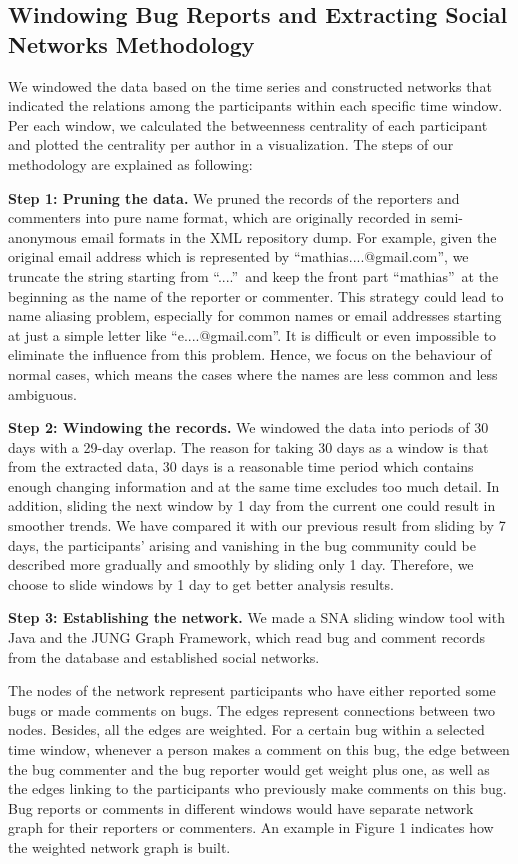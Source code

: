 \documentclass[10pt, conference, compsocconf]{IEEEtran}
\begin{document}
\subsection{Windowing Bug Reports and Extracting Social Networks Methodology}
We windowed the data based on the time series and constructed networks
that indicated the relations among the participants within each specific
time window. Per each window, we calculated the betweenness centrality of each
participant and plotted the centrality per author in a visualization. The steps of our methodology are
explained as following:


\textbf{Step 1: Pruning the data.} We pruned the records of the
reporters and commenters into pure name format, which are originally
recorded in semi-anonymous email formats in the XML repository dump. 
For example, given the original email address which is represented by
\textquotedblleft mathias....@gmail.com\textquotedblright, we truncate
the string starting from \textquotedblleft ....\textquotedblright \
and keep the front part \textquotedblleft mathias\textquotedblright \
at the beginning as the name of the reporter or commenter. 
This strategy could lead to name aliasing problem, especially for
common names or email addresses starting at just a simple letter like
\textquotedblleft e....@gmail.com\textquotedblright.
 It is difficult or even impossible to eliminate the influence from
 this problem. Hence, we focus on the behaviour of normal cases, which
 means the cases where the names are less common and less ambiguous.


\textbf{Step 2: Windowing the records.} We windowed the data into
periods of 30 days with a 29-day overlap. The reason for taking 30
days as a window is that from the extracted data, 30 days is a
reasonable time period which contains enough changing information and
at the same time excludes too much detail. In addition, sliding the
next window by 1 day from the current one could result in smoother
trends. We have compared it with our previous result from sliding by 7
days, the participants' arising and vanishing in the bug community
could be described more gradually and smoothly by sliding only 1
day. Therefore, we choose to slide windows by 1 day to get better
analysis results.


\textbf{Step 3: Establishing the network.} We made a SNA sliding
window tool with Java and the JUNG Graph Framework, which read bug and
comment records from the database and established social networks.


The nodes of the network represent participants who have either
reported some bugs or made comments on bugs. The edges represent
connections between two nodes. Besides, all the edges are
weighted. For a certain bug within a selected time window, whenever a
person makes a comment on this bug, the edge between the bug commenter
and the bug reporter would get weight plus one, as well as the edges
linking to the participants who previously make comments on this
bug. Bug reports or comments in different windows would have separate
network graph for their reporters or commenters. An example in Figure
1 indicates how the weighted network graph is built.
\end{document}
